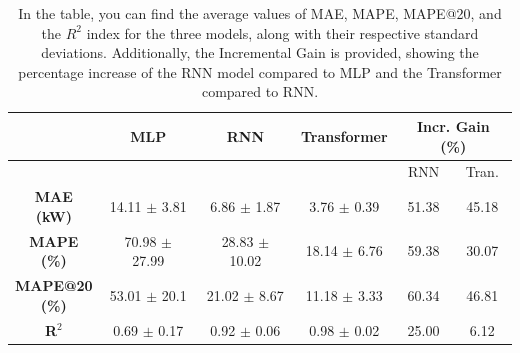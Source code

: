 \begin{table}[H]
	\centering
	\begin{tabular}{c|c|c|c|c|c}

		               & \textbf{MLP}    & \textbf{RNN}    & \textbf{Transformer} & \multicolumn{2}{c}{\textbf{Incr. Gain (\%)}}         \\
		\hline
		               &                 &                 &                      & RNN                                          & Tran. \\
		\cline{5-6}
		\makecell{\textbf{MAE}                                                                                                           \\\textbf{(kW)}} & 14.11 $\pm$ 3.81&6.86 $\pm$ 1.87&3.76 $\pm$ 0.39 &51.38&45.18\\
		\makecell{\textbf{MAPE}                                                                                                          \\\textbf{(\%)}} &70.98 $\pm$ 27.99&28.83 $\pm$ 10.02&18.14 $\pm$ 6.76&59.38&30.07\\
		\makecell{\textbf{MAPE@20}                                                                                                       \\\textbf{(\%)}} &53.01 $\pm$ 20.1&21.02 $\pm$ 8.67&11.18 $\pm$ 3.33&60.34&46.81\\
		\textbf{R$^2$} & 0.69 $\pm$ 0.17 & 0.92 $\pm$ 0.06 & 0.98 $\pm$ 0.02      & 25.00                                        & 6.12

	\end{tabular}
	\caption{In the table, you can find the average values of MAE, MAPE, MAPE@20, and the $R^2$ index for the three models, along with their respective standard deviations. Additionally, the Incremental Gain is provided, showing the percentage increase of the RNN model compared to MLP and the Transformer compared to RNN.}
	\label{tab:comglobalmetrics3modelli}
\end{table}


